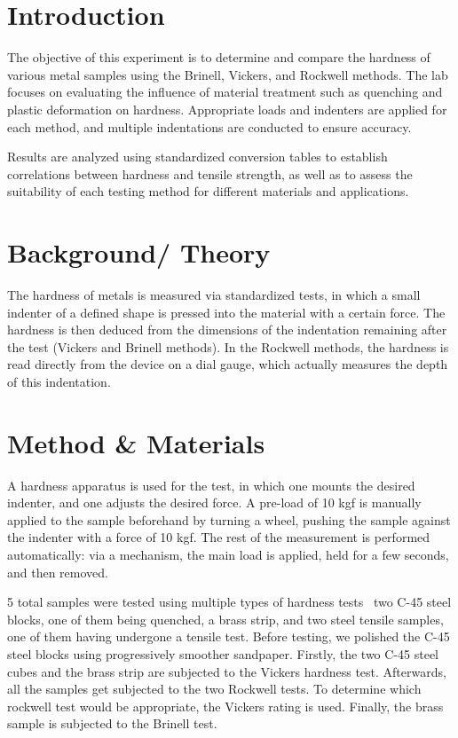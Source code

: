 \documentclass[a4paper]{article}
\begin{document}

\section{Introduction}
The objective of this experiment is to determine and compare the hardness of
various metal samples using the Brinell, Vickers, and Rockwell methods. The
lab focuses on evaluating the influence of material treatment such as
quenching and plastic deformation on hardness. Appropriate loads and indenters
are applied for each method, and multiple indentations are conducted to ensure
accuracy.

Results are analyzed using standardized conversion tables\cite{ASTME140} to establish correlations between hardness and tensile strength, as well as to assess the suitability of each testing method for different materials and applications.

\section{Background/ Theory}

The hardness of metals is measured via standardized tests, in which a small
indenter of a defined shape is pressed into the material with a certain force.
The hardness is then deduced from the dimensions of the indentation remaining
after the test (Vickers and Brinell methods)\cite{ASTME10,ASTME18}. In the Rockwell methods,
the hardness is read directly from the device on a dial gauge, which actually measures the
depth of this indentation.

\section{Method \& Materials}

A hardness apparatus is used for the test, in which one mounts the desired indenter, and one adjusts the desired force. A pre-load of 10 kgf is manually
applied to the sample beforehand by turning a wheel, pushing the sample against
the indenter with a force of 10 kgf. The rest of the measurement is performed
automatically: via a mechanism, the main load is applied, held for a few
seconds, and then removed.

5 total samples were tested using multiple types of hardness tests \textemdash~two
C-45 steel blocks, one of them being quenched, a brass strip, and two steel
tensile samples, one of them having undergone a tensile test. Before testing, we
polished the C-45 steel blocks using progressively smoother sandpaper. Firstly, the two
C-45 steel cubes and the brass strip are subjected to the Vickers hardness test.
Afterwards, all the samples get subjected to the two Rockwell tests. To
determine which rockwell test would be appropriate, the Vickers rating is used.
Finally, the brass sample is subjected to the Brinell test. 
\newpage
\end{document}
